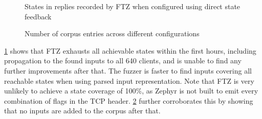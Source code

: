 \documentclass[twocolumn]{article}
\newcommand{\proj}{FTZ\xspace}
\begin{document}
\begin{figure}
  \caption{States in replies recorded by \proj when configured using direct state feedback}
  \label{fig:eval-state-cov}
\end{figure}

\begin{figure}
  \caption{Number of corpus entries across different configurations}
  \label{fig:eval-corpus}
\end{figure}

\cref{fig:eval-state-cov} shows that \proj exhausts all achievable states within the first hours, including propagation to the found inputs to all 640 clients, and is unable to find any further improvements after that. The fuzzer is faster to find inputs covering all reachable states when using parsed input representation. Note that \proj is very unlikely to achieve a state coverage of 100\%, as Zephyr is not built to emit every combination of flags in the TCP header. \cref{fig:eval-corpus} further corroborates this by showing that no inputs are added to the corpus after that.
\end{document}

